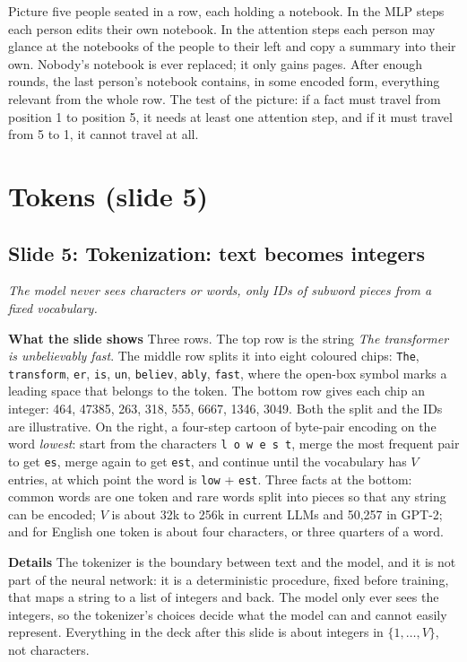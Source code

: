 \documentclass[11pt,letterpaper]{article}
\newcommand{\setstage}[1]{\colorlet{stagec}{#1}}
\newcommand{\slide}[3]{%
  \subsection[Slide #1: #2]{Slide #1: #2}%
  {\color{muted}\itshape #3\par}\medskip}
\newcommand{\para}[1]{\medskip\noindent\textbf{#1}\quad}
\newenvironment{intuition}{\begin{tcolorbox}[intuitionbox]}{\end{tcolorbox}}
\begin{document}
\begin{intuition}
Picture five people seated in a row, each holding a notebook. In the MLP steps each person edits their own notebook. In the attention steps each person may glance at the notebooks of the people to their left and copy a summary into their own. Nobody's notebook is ever replaced; it only gains pages. After enough rounds, the last person's notebook contains, in some encoded form, everything relevant from the whole row. The test of the picture: if a fact must travel from position 1 to position 5, it needs at least one attention step, and if it must travel from 5 to 1, it cannot travel at all.
\end{intuition}

\setstage{tok}
\section{Tokens (slide 5)}

\slide{5}{Tokenization: text becomes integers}{The model never sees characters or words, only IDs of subword pieces from a fixed vocabulary.}

\para{What the slide shows} Three rows. The top row is the string \emph{The transformer is unbelievably fast}. The middle row splits it into eight coloured chips: \texttt{The}, \texttt{\textvisiblespace transform}, \texttt{er}, \texttt{\textvisiblespace is}, \texttt{\textvisiblespace un}, \texttt{believ}, \texttt{ably}, \texttt{\textvisiblespace fast}, where the open-box symbol marks a leading space that belongs to the token. The bottom row gives each chip an integer: 464, 47385, 263, 318, 555, 6667, 1346, 3049. Both the split and the IDs are illustrative. On the right, a four-step cartoon of byte-pair encoding on the word \emph{lowest}: start from the characters \texttt{l o w e s t}, merge the most frequent pair to get \texttt{es}, merge again to get \texttt{est}, and continue until the vocabulary has $V$ entries, at which point the word is \texttt{low} + \texttt{est}. Three facts at the bottom: common words are one token and rare words split into pieces so that any string can be encoded; $V$ is about 32k to 256k in current LLMs and 50,257 in GPT-2; and for English one token is about four characters, or three quarters of a word.

\para{Details} The tokenizer is the boundary between text and the model, and it is not part of the neural network: it is a deterministic procedure, fixed before training, that maps a string to a list of integers and back. The model only ever sees the integers, so the tokenizer's choices decide what the model can and cannot easily represent. Everything in the deck after this slide is about integers in $\{1,\dots,V\}$, not characters.
\end{document}
